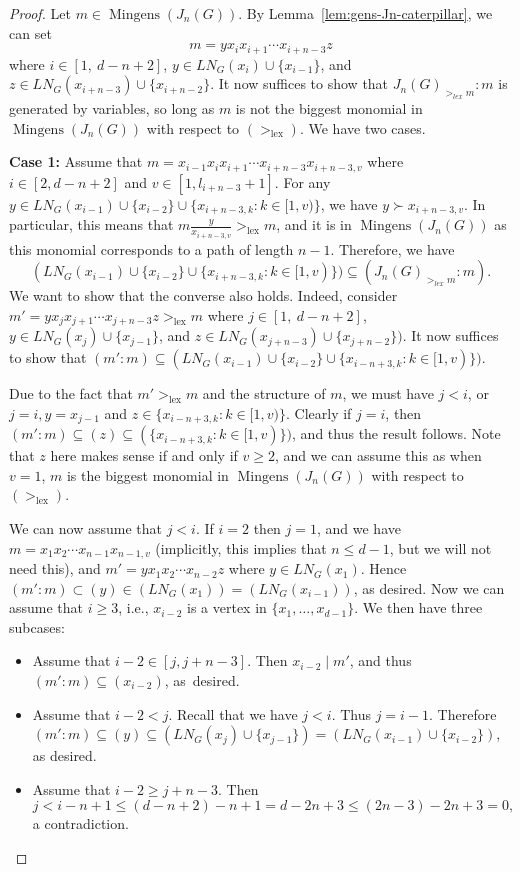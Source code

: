 \documentclass[10pt,a4paper]{amsart}
\DeclareMathOperator{\lex}{lex}
\DeclareMathOperator{\mingens}{Mingens}
\begin{document}
	\begin{proof}
		Let $m\in \mingens(J_n(G))$. By Lemma~\ref{lem:gens-Jn-caterpillar}, we can set \[m=yx_ix_{i+1}\cdots x_{i+n-3}z\]
		where $i\in [1,\ d-n+2]$, $y\in LN_G(x_i)\cup \{x_{i-1}\}$, and $z\in  LN_G(x_{i+n-3})\cup \{x_{i+n-2}\}$. It now suffices to show that $J_n(G)_{>_{lex}m} \colon m$ is generated by variables, so long as $m$ is not the biggest monomial in $\mingens(J_n(G))$ with respect to $(>_{\lex})$. We have two cases.
		
		\textbf{Case 1:} Assume that $m=x_{i-1}x_ix_{i+1}\cdots x_{i+n-3}x_{i+n-3,v}$ where $i\in [2, d-n+2]$ and $v\in [1, l_{i+n-3}+1]$. For any $y\in LN_G(x_{i-1}) \cup \{x_{i-2}\} \cup \{x_{i+n-3,k}\colon k\in [1,v)\}$, we have $y\succ x_{i+n-3,v}$. In particular, this means that  $m\frac{y}{x_{i+n-3,v}} >_{\lex}  m$, and it is in $\mingens(J_n(G))$ as this monomial corresponds to a path of length $n-1$. Therefore, we have 
		\[
		(LN_G(x_{i-1}) \cup \{x_{i-2}\} \cup \{x_{i+n-3,k}\colon k\in [1,v)\}) \subseteq (J_n(G)_{>_{lex}m}\colon m).
		\]
		We want to show that the converse also holds. Indeed, consider $m'=yx_jx_{j+1}\cdots x_{j+n-3}z>_{\lex}  m$ where $j\in [1,\ d-n+2]$, $y\in LN_G(x_j)\cup \{x_{j-1}\}$, and $z\in  LN_G(x_{j+n-3})\cup \{x_{j+n-2}\})$. It now suffices to show that $(m':m)\subseteq (LN_G(x_{i-1}) \cup \{x_{i-2}\} \cup \{x_{i-n+3,k}\colon k\in [1,v)\})$.
		
		Due to the fact that $m'>_{\lex}  m$ and the structure of $m$, we must have $j<i$, or $j=i, y=x_{j-1}$ and $z\in \{x_{i-n+3,k}\colon k\in [1,v)\}$. Clearly if $j=i$, then $(m'\colon m)\subseteq (z)\subseteq (\{x_{i-n+3,k}\colon k\in [1,v)\})$, and thus the result follows. Note that $z$ here makes sense if and only if $v\geq 2$, and we can assume this as when $v=1$, $m$ is the biggest monomial in $\mingens(J_n(G))$ with respect to $(>_{\lex})$.
		
		We can now assume that $j<i$. If $i=2$ then $j=1$, and we have $m=x_1x_2\cdots x_{n-1}x_{n-1,v}$ (implicitly, this implies that $n\leq d-1$, but we will not need this), and $m'=yx_1x_2\cdots x_{n-2} z$ where $y\in LN_G(x_1)$. Hence $(m'\colon m) \subset (y)\in (LN_G(x_1))=(LN_G(x_{i-1}))$, as desired. Now we can assume that $i\geq 3$, i.e., $x_{i-2}$ is a vertex in $\{x_1,\dots, x_{d-1}\}$. We then have three subcases:
		\begin{itemize}
			\item Assume that $i-2\in [j,j+n-3]$. Then $x_{i-2}\mid m'$, and thus $(m'\colon m) \subseteq (x_{i-2})$, as~desired.
			\item Assume that $i-2<j$. Recall that we have $j<i$. Thus $j=i-1$. Therefore $(m'\colon m)\subseteq (y)\subseteq (LN_G(x_{j})\cup \{x_{j-1}\}) = (LN_G(x_{i-1})\cup \{x_{i-2}\})$, as desired.
			\item Assume that $i-2\geq j+n-3$. Then \[
			j<i-n+1 \leq (d-n+2)-n+1 = d-2n+3 \leq (2n-3)-2n+3 =0,
			\]
			a contradiction.
		\end{itemize}
		

\end{proof}
\end{document}
